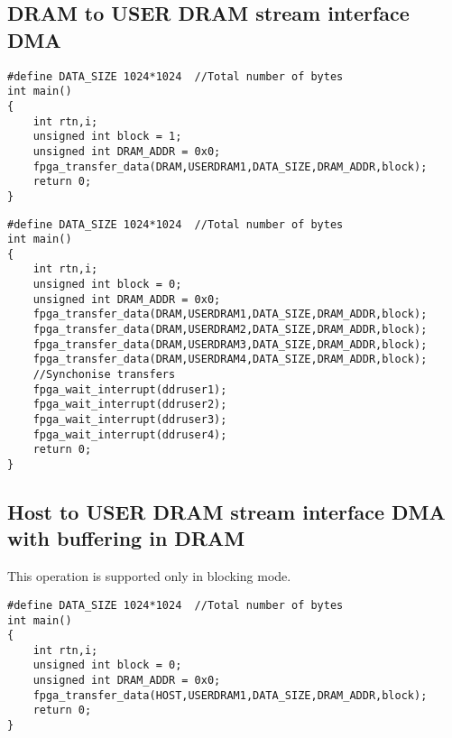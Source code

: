 \subsection{DRAM to USER DRAM stream interface DMA}

\begin{verbatim}
#define DATA_SIZE 1024*1024  //Total number of bytes
int main() 
{
    int rtn,i;
    unsigned int block = 1;
    unsigned int DRAM_ADDR = 0x0;
    fpga_transfer_data(DRAM,USERDRAM1,DATA_SIZE,DRAM_ADDR,block);
    return 0;
} 
\end{verbatim} 


\begin{verbatim}
#define DATA_SIZE 1024*1024  //Total number of bytes
int main() 
{
    int rtn,i;
    unsigned int block = 0;
    unsigned int DRAM_ADDR = 0x0;
    fpga_transfer_data(DRAM,USERDRAM1,DATA_SIZE,DRAM_ADDR,block);
    fpga_transfer_data(DRAM,USERDRAM2,DATA_SIZE,DRAM_ADDR,block);
    fpga_transfer_data(DRAM,USERDRAM3,DATA_SIZE,DRAM_ADDR,block);
    fpga_transfer_data(DRAM,USERDRAM4,DATA_SIZE,DRAM_ADDR,block);
    //Synchonise transfers
    fpga_wait_interrupt(ddruser1);   
    fpga_wait_interrupt(ddruser2); 
    fpga_wait_interrupt(ddruser3); 
    fpga_wait_interrupt(ddruser4); 
    return 0;
} 
\end{verbatim}         

\subsection{Host to USER DRAM stream interface DMA with buffering in DRAM}
This operation is supported only in blocking mode.
\begin{verbatim}
#define DATA_SIZE 1024*1024  //Total number of bytes
int main() 
{
    int rtn,i;
    unsigned int block = 0;
    unsigned int DRAM_ADDR = 0x0;
    fpga_transfer_data(HOST,USERDRAM1,DATA_SIZE,DRAM_ADDR,block);
    return 0;
} 
\end{verbatim}    
